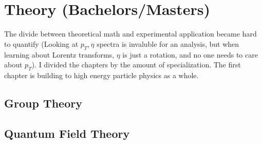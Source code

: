 \documentclass[12pt, a4paper]{book}
\begin{document}
	\tableofcontents
	\chapter{Theory (Bachelors/Masters)}
		The divide between theoretical math and experimental application became hard to quantify (Looking at \(p_T,\eta\) spectra is invaluble for an analysis, but when learning about Lorentz transforms, \(\eta\) is just a rotation, and no one needs to care about \(p_T\)).
		I divided the chapters by the amount of specialization. The first chapter is building to high energy particle physics as a whole.
		\section{Group Theory}

			
		\section{Quantum Field Theory}
			
\end{document}
